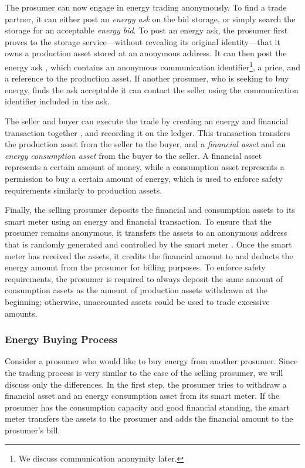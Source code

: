 The prosumer can now engage in energy trading anonymously.  To find a
trade partner, it can either post an \emph{energy ask} on the bid
storage, or simply search the storage for an acceptable \emph{energy
  bid}.  To post an energy ask, the prosumer first proves to the
storage service---without revealing its original identity---that it
owns a production asset stored at an anonymous address.  It can then
post the energy ask , which contains an anonymous
communication identifier\footnote{We discuss communication anonymity later.}, a price, and a reference
to the production asset.  If another prosumer, who is seeking to buy energy,
finds the ask acceptable it can contact the seller using the
communication identifier included in the ask.

The seller and buyer can execute the trade by creating an energy and
financial transaction together , and recording it on the
ledger.  This transaction transfers the production asset from the
seller to the buyer, and a \emph{financial asset} and an \emph{energy
  consumption asset} from the buyer to the seller.  A financial asset
represents a certain amount of money, while a consumption asset
represents a permission to buy a certain amount of energy, which is
used to enforce safety requirements similarly to production assets.

Finally, the selling prosumer deposits the financial and consumption
assets to its smart meter using an energy and financial transaction.
To ensure that the prosumer remains anonymous, it transfers the assets
to an anonymous address that is randomly generated and controlled by
the smart meter .  Once the smart meter has received the
assets, it credits the financial amount to and deducts the energy
amount from the prosumer for billing purposes.  To enforce safety
requirements, the prosumer is required to always deposit the same amount of
consumption assets as the amount of production assets withdrawn at the
beginning; otherwise, unaccounted assets could be used to trade
excessive amounts.

\subsubsection{Energy Buying Process}
Consider a prosumer who would like to buy energy from another prosumer.
Since the trading process is very similar to the case of the selling prosumer, we will discuss only the differences.
In the first step, the prosumer tries to withdraw a financial asset and an energy consumption asset from its smart meter.
If the prosumer has the consumption capacity and good financial standing, the smart meter transfers the assets to the prosumer and adds the financial amount to the prosumer's bill.

